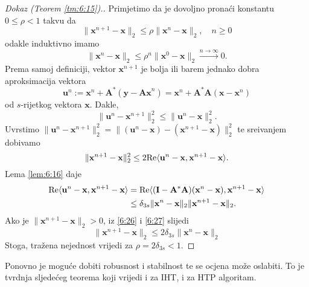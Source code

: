 \documentclass[a4paper,twoside,12pt]{memoir} %
\newcommand{\vect}[1]{\mathbf{#1}}
\renewcommand{\vec}{\vect}
\newcommand{\norm}[1]{\|{#1}\|}
\renewcommand{\Re}{\text{\normalfont{Re}}}
\begin{document}
\begin{proof}[Dokaz (Teorem \ref{tm:6:15}).]
    Primjetimo da je dovoljno prona\'ci konstantu $0 \leq \rho < 1$ takvu da 
    \begin{equation}\label{6:25}
        \norm{\vec x^{n+1} - \vec x}_2 \leq \rho \norm{\vec x^n - \vec x}_2, \quad n \geq 0
    \end{equation}
    odakle induktivno imamo
    \begin{equation*}
        \norm{\vec x^{n} - \vec x}_2 \leq \rho^n \norm{\vec x^0 - \vec x}_2 \xrightarrow{n \rightarrow \infty} 0. 
    \end{equation*}
    Prema samoj definiciji, vektor $\vec x^{n+1}$ je bolja ili barem jednako dobra aproksimacija vektora
    \begin{equation*}
        \vec u^n := \vec x^n + \vec A^*(\vec y - \vec{Ax}^n) = \vec x^n + \vec A^* \vec A (\vec x - \vec x^n) 
    \end{equation*}
    od $s$-rijetkog vektora $\vec x$. Dakle, 
    \begin{equation*}
        \norm{\vec u^n - \vec x^{n+1}}_2^2 \leq \norm{\vec u^n - \vec x}_2^2. 
    \end{equation*}
    Uvrstimo $\norm{\vec u ^n - \vec x^{n+1}}_2^2 = \norm{(\vec u ^n - \vec x) - (\vec x^{n+1} - \vec x)}_2^2$ te sre\dj ivanjem dobivamo
    \begin{equation}\label{6:26}
        \norm{\vec x^{n+1} - \vec x}_2^2 \leq 2 \Re \langle \vec u^n - \vec x, \vec x^{n+1} - \vec x \rangle .
    \end{equation}
    Lema \ref{lem:6:16} daje
    \begin{align}
        \Re \langle \vec u^n - \vec x, \vec x^{n+1} - \vec x \rangle &= \Re \langle (\vec I - \vec A^*\vec A)(\vec x^n - \vec x), \vec x^{n+1} - \vec x \rangle \nonumber \\
                                                                     &\leq \delta_{3s} \norm{\vec x^n - \vec x}_2 \norm{\vec x^{n+1} - \vec x}_2. \label{6:27}
    \end{align}
    Ako je $\norm{\vec x^{n+1} - \vec x}_2 > 0$, iz \eqref{6:26} i \eqref{6:27} slijedi
    \begin{equation*}
        \norm{\vec x^{n+1} - \vec x}_2 \leq 2 \delta_{3s} \norm{\vec x^n - \vec x}_2 
    \end{equation*}
    Stoga, tra\v{z}ena nejednost vrijedi za $ \rho  = 2 \delta_{3s} < 1$.
\end{proof}
Ponovno je mogu\'ce dobiti robusnost i stabilnost te se ocjena mo\v{z}e oslabiti. To je tvrdnja sljede\'ceg teorema koji vrijedi i za IHT, i za HTP algoritam.
\end{document}
